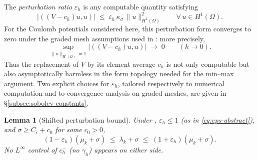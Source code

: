 \documentclass[11pt]{article}
\theoremstyle{plain}
\newtheorem{lemma}{Lemma}
\theoremstyle{definition}
\theoremstyle{remark}
\begin{document}
The \emph{perturbation ratio} $\varepsilon_h$ is any computable
quantity satisfying
\begin{equation}
\label{eq:eps-abstract}
  |((V-c_h)u,u)| \;\le\; \varepsilon_h\,\kappa_\sigma\,\|u\|_{H^1(\Omega)}^2
  \qquad\forall\,u\in H^1(\Omega).
\end{equation}
For the Coulomb potentials considered here, this perturbation form
converges to zero under the graded mesh assumptions used in
: more precisely,
\[
  \sup_{\|u\|_{H^1(\Omega)}=1}|((V-c_h)u,u)| \;\longrightarrow\;0
  \qquad (h\to0).
\]
Thus the replacement of $V$ by its element average $c_h$ is not only
computable but also asymptotically harmless in the form topology
needed for the min--max argument. Two explicit choices for
$\varepsilon_h$, tailored respectively to numerical computation and
to convergence analysis on graded meshes, are given in
\S\ref{subsec:sobolev-constants}.

\begin{lemma}[Shifted perturbation bound]
\label{lem:perturb-sigma}
Under , $\varepsilon_h\le 1$ (as in
\eqref{eq:eps-abstract}), and $\sigma\ge C_\epsilon+c_0$ for some
$c_0>0$,
\begin{equation}
\label{eq:perturb-sigma}
  (1-\varepsilon_h)(\mu_k+\sigma)
  \;\le\; \lambda_k+\sigma
  \;\le\; (1+\varepsilon_h)(\mu_k+\sigma).
\end{equation}
No $L^\infty$ control of $c_h^-$ (no $\gamma_h$) appears on either side.
\end{lemma}
\end{document}
